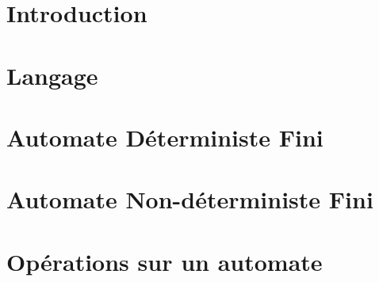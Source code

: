 

\newcommand{\student}{Benjamin André}
\newcommand{\grade}{MAB2 Sciences Informatiques}
\newcommand{\director}{Véronique Bruyère}
\renewcommand{\title}{Automates}
\renewcommand{\date}{\today}


	
		
	
	\tableofcontents
	\newpage
	
	\section{Introduction}\label{sec:intro}
	\section{Langage}\label{sec:langage}
	\section{Automate Déterministe Fini}\label{sec:adf}
	\section{Automate Non-déterministe Fini}\label{sec:anf}
	\section{Opérations sur un automate}\label{sec:opauto}
	
	\newpage
	
	
	
